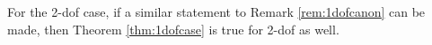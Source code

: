 



\begin{observation}
\label{obs:2dof_case}
    For the 2-dof case, if a similar statement to Remark \ref{rem:1dofcanon} can be made, then Theorem \ref{thm:1dofcase} is true for 2-dof as well.
\end{observation}


